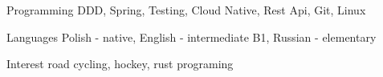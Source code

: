 

\begin{cvskills}

  \cvskill
    {Programming} %
    {DDD, Spring, Testing, Cloud Native, Rest Api, Git, Linux} %

  \cvskill
    {Languages} %
    {Polish - native, English - intermediate B1,  Russian - elementary } %


  \cvskill
    {Interest} %
    {road cycling, hockey, rust programing} %

\end{cvskills}

